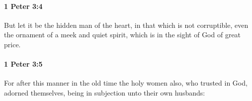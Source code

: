 		\paragraph{1 Peter 3:4} %
			\label{1PETER-3-4}

			But let it be the hidden man of the heart, in that which is not corruptible, even the ornament of a meek and quiet spirit, which is in the sight of God of great price.

			\begin{framed}
			\scriptsize
				\begin{compactdesc}
					\item[SBLG] 
				\end{compactdesc}
			\end{framed}

		\paragraph{1 Peter 3:5} %
			\label{1PETER-3-5}

			For after this manner in the old time the holy women also, who trusted in God, adorned themselves, being in subjection unto their own husbands:

